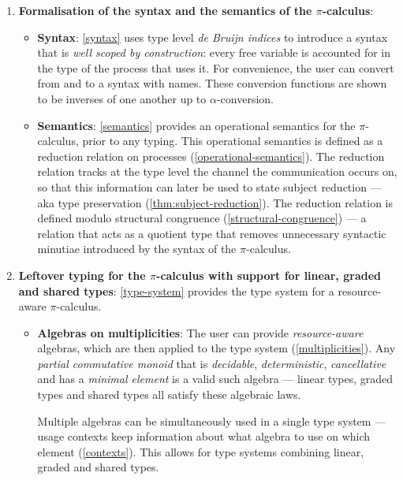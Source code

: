 \documentclass[sigplan,10pt,anonymous,review]{acmart}
\theoremstyle{definition}
\newcommand{\picalc}{$\pi$-calculus}
\begin{document}
\begin{enumerate}
\item \textbf{Formalisation of the syntax and the semantics of the \picalc{}}:
 \begin{itemize}
   \item \textbf{Syntax}: \autoref{syntax} uses type level \emph{de Bruijn indices} \cite{deBruijn1972, Dybjer1994} to introduce a syntax that is \emph{well scoped by construction}: every free variable is accounted for in the type of the process that uses it.
     For convenience, the user can convert from and to a syntax with names.
     These conversion functions are shown to be inverses of one another up to $\alpha$-conversion.
   
   \item \textbf{Semantics}: \autoref{semantics} provides an operational semantics for the \picalc{}, prior to any typing.
   This operational semantics is defined as a reduction relation on processes (\autoref{operational-semantics}).
   The reduction relation tracks at the type level the channel the communication occurs on, so that this information can later be used to state subject reduction --- aka type preservation (\autoref{thm:subject-reduction}).
   The reduction relation is defined modulo structural congruence (\autoref{structural-congruence}) --- a relation that acts as a quotient type that removes unnecessary syntactic minutiae introduced by the syntax of the \picalc{}.
 \end{itemize}
  
  \item \textbf{Leftover typing for the \picalc{} with support for linear, graded and shared types}:
  \autoref{type-system} provides the type system for a resource-aware \picalc{}.
  \begin{itemize}
    \item \textbf{Algebras on multiplicities}: The user can provide \emph{resource-aware} algebras, which are then applied to the type system (\autoref{multiplicities}).
    Any \emph{partial commutative monoid} that is \emph{decidable}, \emph{deterministic}, \emph{cancellative} and has a \emph{minimal element} is a valid such algebra --- linear types, graded types and shared types all satisfy these algebraic laws.

    Multiple algebras can be simultaneously used in a single type system --- usage contexts keep information about what algebra to use on which element (\autoref{contexts}).
    This allows for type systems combining linear, graded and shared types.
    

\end{itemize}
\end{enumerate}
\end{document}
